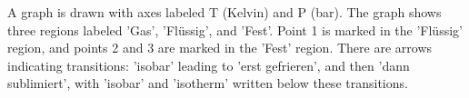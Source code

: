 A graph is drawn with axes labeled T (Kelvin) and P (bar). The graph shows three regions labeled 'Gas', 'Flüssig', and 'Fest'. Point 1 is marked in the 'Flüssig' region, and points 2 and 3 are marked in the 'Fest' region. There are arrows indicating transitions: 'isobar' leading to 'erst gefrieren', and then 'dann sublimiert', with 'isobar' and 'isotherm' written below these transitions.